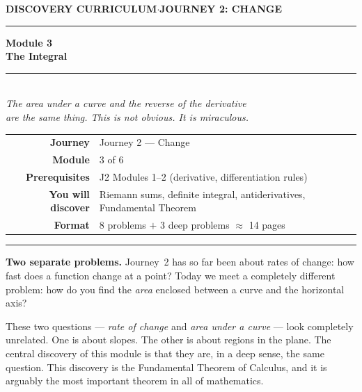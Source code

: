 \documentclass[12pt, a4paper]{article}
\newcounter{problem}
\begin{document}

\thispagestyle{empty}
\begin{center}
{\small\color{MidBlue}\textbf{DISCOVERY CURRICULUM}\quad$\cdot$\quad\textbf{JOURNEY 2: CHANGE}}

\vspace{0.6cm}
{\color{NavyBlue}\rule{\linewidth}{2pt}}
\vspace{0.5cm}

{\Huge\bfseries\color{NavyBlue}Module 3}\\[0.3cm]
{\LARGE\bfseries\color{MidBlue}The Integral}\\[0.4cm]
{\color{Gold}\rule{0.4\linewidth}{1.2pt}}\\[0.4cm]
{\large\itshape\color{DarkGrey}
The area under a curve and the reverse of the derivative\\[0.15cm]
are the same thing. This is not obvious. It is miraculous.}

\vspace{1cm}
\begin{tabular}{rl}
\color{DarkGrey}\textbf{Journey}           & Journey 2 --- Change \\[4pt]
\color{DarkGrey}\textbf{Module}            & 3 of 6 \\[4pt]
\color{DarkGrey}\textbf{Prerequisites}     & J2 Modules 1--2 (derivative, differentiation rules) \\[4pt]
\color{DarkGrey}\textbf{You will discover} & Riemann sums, definite integral, antiderivatives, Fundamental Theorem \\[4pt]
\color{DarkGrey}\textbf{Format}            & 8 problems $+$ 3 deep problems $\approx$ 14 pages \\
\end{tabular}

\vspace{1cm}
{\color{NavyBlue}\rule{\linewidth}{2pt}}
\end{center}

\vspace{0.5cm}

\noindent\textbf{Two separate problems.}
Journey~2 has so far been about rates of change: how fast does a function change at a point? Today we meet a completely different problem: how do you find the \emph{area} enclosed between a curve and the horizontal axis?

\medskip
These two questions --- \emph{rate of change} and \emph{area under a curve} --- look completely unrelated. One is about slopes. The other is about regions in the plane. The central discovery of this module is that they are, in a deep sense, the same question. This discovery is the Fundamental Theorem of Calculus, and it is arguably the most important theorem in all of mathematics.
\end{document}
